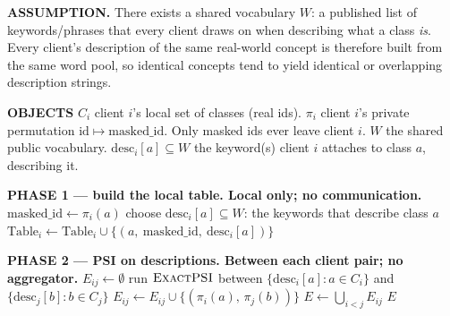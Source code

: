 \documentclass[11pt]{article}
\newcommand{\psiexact}{\textsc{ExactPSI}}
\begin{document}
\clearpage

\begin{algorithm}[p]
\caption{Shared-vocabulary description PSI}
\label{alg:a1}
\footnotesize
{}
\begin{algorithmic}[1]

\Statex \hrulefill
\Statex \textbf{ASSUMPTION.} There exists a shared vocabulary $W$: a
        published list of keywords/phrases that every client draws on when
        describing what a class \emph{is}. Every client's description of the
        same real-world concept is therefore built from the same word pool,
        so identical concepts tend to yield identical or overlapping
        description strings.

\Statex \textbf{OBJECTS}
\Statex \quad $C_i$ \quad client $i$'s local set of classes (real ids).
\Statex \quad $\pi_i$ \quad client $i$'s private permutation
        $\mathrm{id} \mapsto \mathrm{masked\_id}$. Only masked ids ever leave
        client $i$.
\Statex \quad $W$ \quad the shared public vocabulary.
\Statex \quad $\mathrm{desc}_i[a] \subseteq W$ \quad the keyword(s) client $i$
        attaches to class $a$, describing it.

\Statex \hrulefill
\Statex \textbf{PHASE 1 --- build the local table. Local only; no
        communication.}
    \State $\mathrm{masked\_id} \gets \pi_i(a)$
    \State choose $\mathrm{desc}_i[a] \subseteq W$: the keywords that
           describe class $a$
    \State $\mathrm{Table}_i \gets \mathrm{Table}_i \cup
           \{(a,\ \mathrm{masked\_id},\ \mathrm{desc}_i[a])\}$
  \EndFor
\EndFor

\Statex \hrulefill
\Statex \textbf{PHASE 2 --- PSI on descriptions. Between each client pair; no
        aggregator.}
  \State $E_{ij} \gets \emptyset$
  \State run $\psiexact$ between $\{\mathrm{desc}_i[a] : a \in C_i\}$ and
         $\{\mathrm{desc}_j[b] : b \in C_j\}$
    \State $E_{ij} \gets E_{ij} \cup \{(\pi_i(a),\, \pi_j(b))\}$
  \EndFor
\EndFor
\State $E \gets \bigcup_{i<j} E_{ij}$
\State \Return $E$
\Statex \hrulefill

\end{algorithmic}
\end{algorithm}
\end{document}
